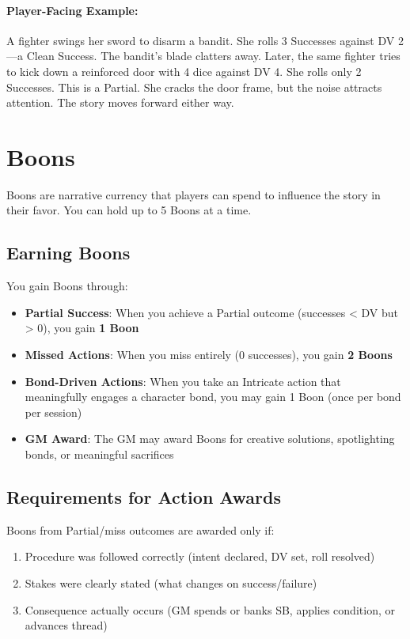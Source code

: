 \paragraph{Player-Facing Example:}  
A fighter swings her sword to disarm a bandit. She rolls 3 Successes against DV 2—a Clean Success. The bandit's blade clatters away.  
Later, the same fighter tries to kick down a reinforced door with 4 dice against DV 4. She rolls only 2 Successes. This is a Partial. She cracks the door frame, but the noise attracts attention. The story moves forward either way.

\section{Boons} 

Boons are narrative currency that players can spend to influence the story in their favor. You can hold up to 5 Boons at a time.

\subsection*{Earning Boons}
You gain Boons through:
\begin{itemize}
\item \textbf{Partial Success}: When you achieve a Partial outcome (successes < DV but > 0), you gain \textbf{1 Boon}
\item \textbf{Missed Actions}: When you miss entirely (0 successes), you gain \textbf{2 Boons}
\item \textbf{Bond-Driven Actions}: When you take an Intricate action that meaningfully engages a character bond, you may gain 1 Boon (once per bond per session)
\item \textbf{GM Award}: The GM may award Boons for creative solutions, spotlighting bonds, or meaningful sacrifices
\end{itemize}

\subsection*{Requirements for Action Awards}
Boons from Partial/miss outcomes are awarded only if:
\begin{enumerate}
\item Procedure was followed correctly (intent declared, DV set, roll resolved)
\item Stakes were clearly stated (what changes on success/failure)
\item Consequence actually occurs (GM spends or banks SB, applies condition, or advances thread)
\end{enumerate}


